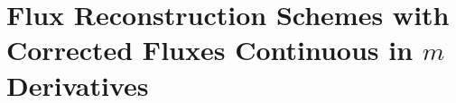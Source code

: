 
\chapter{Flux Reconstruction Schemes with Corrected Fluxes Continuous in $m$ Derivatives}















%
%
%
%
%
